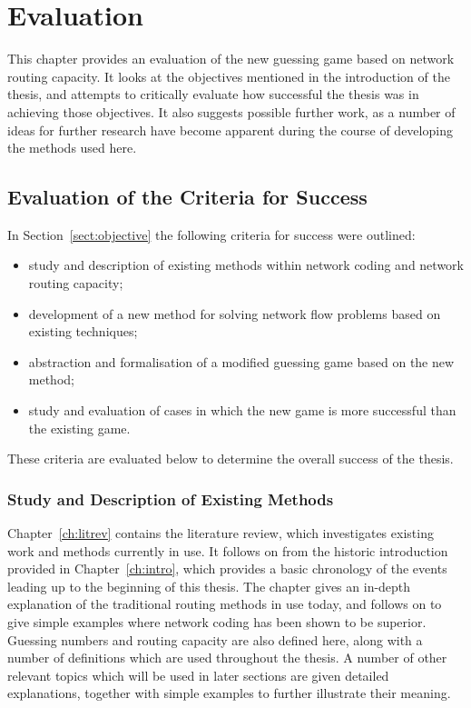 
\chapter{Evaluation}
\label{ch:eval}

This chapter provides an evaluation of the new guessing game based on network routing capacity. It looks at the objectives mentioned in the introduction of the thesis, and attempts to critically evaluate how successful the thesis was in achieving those objectives. It also suggests possible further work, as a number of ideas for further research have become apparent during the course of developing the methods used here.

\section{Evaluation of the Criteria for Success}

In Section~\ref{sect:objective} the following criteria for success were outlined:

\begin{itemize}
	\item{study and description of existing methods within network coding and network routing capacity;}
 	\item{development of a new method for solving network flow problems based on existing techniques;}
 	\item{abstraction and formalisation of a modified guessing game based on the new method;}
 	\item{study and evaluation of cases in which the new game is more successful than the existing game.}
\end{itemize}

These criteria are evaluated below to determine the overall success of the thesis.

\subsection{Study and Description of Existing Methods}

Chapter~\ref{ch:litrev} contains the literature review, which investigates existing work and methods currently in use. It follows on from the historic introduction provided in Chapter~\ref{ch:intro}, which provides a basic chronology of the events leading up to the beginning of this thesis. The chapter gives an in-depth explanation of the traditional routing methods in use today, and follows on to give simple examples where network coding has been shown to be superior. Guessing numbers and routing capacity are also defined here, along with a number of definitions which are used throughout the thesis. A number of other relevant topics which will be used in later sections are given detailed explanations, together with simple examples to further illustrate their meaning.

